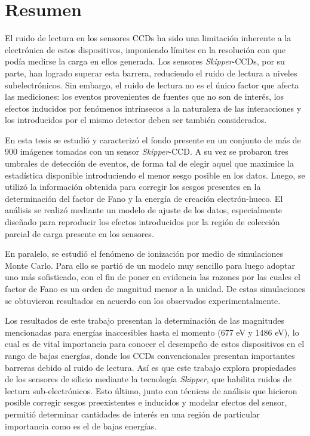 \newpage
\chapter*{Resumen}
\thispagestyle{empty}
\vspace{-10mm}
\noindent El ruido de lectura en los sensores CCDs ha sido una limitación inherente a la electrónica de estos dispositivos, imponiendo límites en la resolución con que podía medirse la carga en ellos generada. Los sensores \textit{Skipper}-CCDs, por su parte, han logrado superar esta barrera, reduciendo el ruido de lectura a niveles subelectrónicos. Sin embargo, el ruido de lectura no es el único factor que afecta las mediciones: los eventos provenientes de fuentes que no son de interés, los efectos inducidos por fenómenos intrínsecos a la naturaleza de las interacciones y los introducidos por el mismo detector deben ser también considerados.


En esta tesis se estudió y caracterizó el fondo presente en un conjunto de más de $900$ imágenes tomadas con un sensor \textit{Skipper}-CCD. A su vez se probaron tres umbrales de detección de eventos, de forma tal de elegir aquel que maximice la estadística disponible introduciendo el menor sesgo posible en los datos. Luego, se utilizó la información obtenida para corregir los sesgos presentes en la determinación del factor de Fano y la energía de creación electrón-hueco. El análisis se realizó mediante un modelo de ajuste de los datos, especialmente diseñado para reproducir los efectos introducidos por la región de colección parcial de carga presente en los sensores.


En paralelo, se estudió el fenómeno de ionización por medio de simulaciones Monte Carlo. Para ello se partió de un modelo muy sencillo para luego adoptar uno más sofisticado, con el fin de poner en evidencia las razones por las cuales el factor de Fano es un orden de magnitud menor a la unidad. De estas simulaciones se obtuvieron resultados en acuerdo con los observados experimentalmente.


Los resultados de este trabajo presentan la determinación de las magnitudes mencionadas para energías inaccesibles hasta el momento (677 eV y 1486 eV), lo cual es de vital importancia para conocer el desempeño de estos dispositivos en el rango de bajas energías, donde los CCDs convencionales presentan importantes barreras debido al ruido de lectura. Así es que este trabajo explora propiedades de los sensores de silicio mediante la tecnología \textit{Skipper}, que habilita ruidos de lectura sub-electrónicos. Esto último, junto con técnicas de análisis que hicieron posible corregir sesgos preexistentes e inducidos y modelar efectos del sensor, permitió determinar cantidades de interés en una región de particular importancia como es el de bajas energías.


\newpage
\thispagestyle{empty} \mbox{}
\thispagestyle{empty}
